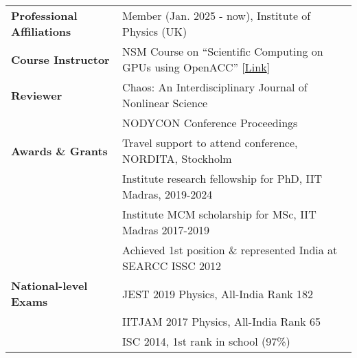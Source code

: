 \begin{longtable}[l]{@{} m{5cm} m{12cm}}

\textbf{Professional Affiliations} & Member (Jan. 2025 - now), Institute of Physics (UK)\\[0.3cm]

\textbf{Course Instructor} & NSM Course on ``Scientific Computing on GPUs using OpenACC'' [\href{https://www.cse.iitm.ac.in/~rupesh/events/openacc23/}{Link}]\\ [0.3cm]

\textbf{Reviewer} & Chaos: An Interdisciplinary Journal of Nonlinear Science \\
                                    & NODYCON Conference Proceedings \\ [0.3cm]

\textbf{Awards \& Grants} & Travel support to attend conference, NORDITA, Stockholm\\
                                         & Institute research fellowship for PhD, IIT Madras, 2019-2024\\
                                         & Institute MCM scholarship for MSc, IIT Madras 2017-2019\\
                                         & Achieved 1st position \& represented India at SEARCC ISSC 2012\\[0.3cm]

\textbf{National-level Exams} & JEST 2019 Physics, All-India Rank 182\\
                                                & IITJAM 2017 Physics, All-India Rank 65\\
                                                & ISC 2014, 1st rank in school (97\%)
\end{longtable}